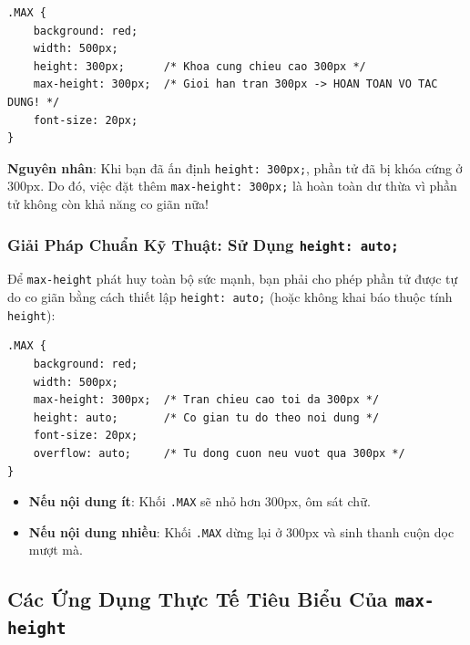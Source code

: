 \documentclass[11pt,oneside]{book}
\newcommand{\codeinline}[1]{\textcolor{accentOrange}{\texttt{#1}}}
\DeclareRobustCommand{\csshint}[1]{\texorpdfstring{\textcolor{accentOrange}{\textbf{\texttt{#1}}}}{#1}}
\begin{document}
\begin{warnBox}
\begin{lstlisting}[language=CSS3]
.MAX {
    background: red;
    width: 500px;
    height: 300px;      /* Khoa cung chieu cao 300px */
    max-height: 300px;  /* Gioi han tran 300px -> HOAN TOAN VO TAC DUNG! */
    font-size: 20px;
}
\end{lstlisting}
\textbf{Nguyên nhân}: Khi bạn đã ấn định \codeinline{height: 300px;}, phần tử đã bị khóa cứng ở $300\text{px}$. Do đó, việc đặt thêm \codeinline{max-height: 300px;} là hoàn toàn dư thừa vì phần tử không còn khả năng co giãn nữa!
\end{warnBox}

\subsubsection{Giải Pháp Chuẩn Kỹ Thuật: Sử Dụng \csshint{height: auto;}}

Để \codeinline{max-height} phát huy toàn bộ sức mạnh, bạn phải cho phép phần tử được tự do co giãn bằng cách thiết lập \codeinline{height: auto;} (hoặc không khai báo thuộc tính \codeinline{height}):

\begin{codeWindow}
\begin{lstlisting}[language=CSS3]
.MAX {
    background: red;
    width: 500px;
    max-height: 300px;  /* Tran chieu cao toi da 300px */
    height: auto;       /* Co gian tu do theo noi dung */
    font-size: 20px;
    overflow: auto;     /* Tu dong cuon neu vuot qua 300px */
}
\end{lstlisting}
\end{codeWindow}

\begin{itemize}[leftmargin=1.5em, itemsep=3pt, parsep=0pt]
    \item \textbf{Nếu nội dung ít}: Khối \codeinline{.MAX} sẽ nhỏ hơn $300\text{px}$, ôm sát chữ.
    \item \textbf{Nếu nội dung nhiều}: Khối \codeinline{.MAX} dừng lại ở $300\text{px}$ và sinh thanh cuộn dọc mượt mà.
\end{itemize}

\subsection{Các Ứng Dụng Thực Tế Tiêu Biểu Của \csshint{max-height}}
\label{subsec:practical_apps_max_height}
\end{document}
